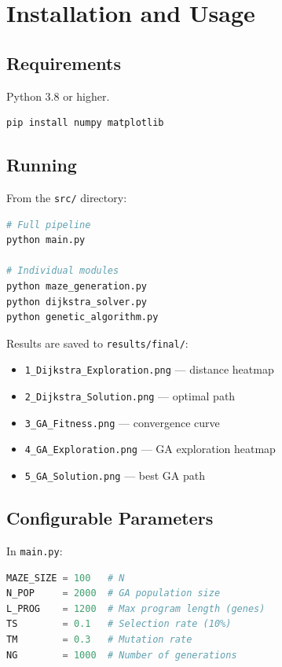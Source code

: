 \documentclass[12pt, a4paper]{article}
\theoremstyle{definition}
\newcommand{\code}[1]{\texttt{#1}}
\begin{document}
\section{Installation and Usage}

\subsection{Requirements}

Python 3.8 or higher.

\begin{lstlisting}[language=bash]
pip install numpy matplotlib
\end{lstlisting}

\subsection{Running}

From the \code{src/} directory:

\begin{lstlisting}[language=bash]
# Full pipeline
python main.py

# Individual modules
python maze_generation.py
python dijkstra_solver.py
python genetic_algorithm.py
\end{lstlisting}

Results are saved to \code{results/final/}:

\begin{itemize}[noitemsep]
    \item \code{1\_Dijkstra\_Exploration.png} --- distance heatmap
    \item \code{2\_Dijkstra\_Solution.png} --- optimal path
    \item \code{3\_GA\_Fitness.png} --- convergence curve
    \item \code{4\_GA\_Exploration.png} --- GA exploration heatmap
    \item \code{5\_GA\_Solution.png} --- best GA path
\end{itemize}

\subsection{Configurable Parameters}

In \code{main.py}:

\begin{lstlisting}[language=Python]
MAZE_SIZE = 100   # N
N_POP     = 2000  # GA population size
L_PROG    = 1200  # Max program length (genes)
TS        = 0.1   # Selection rate (10%)
TM        = 0.3   # Mutation rate
NG        = 1000  # Number of generations
\end{lstlisting}
\end{document}

